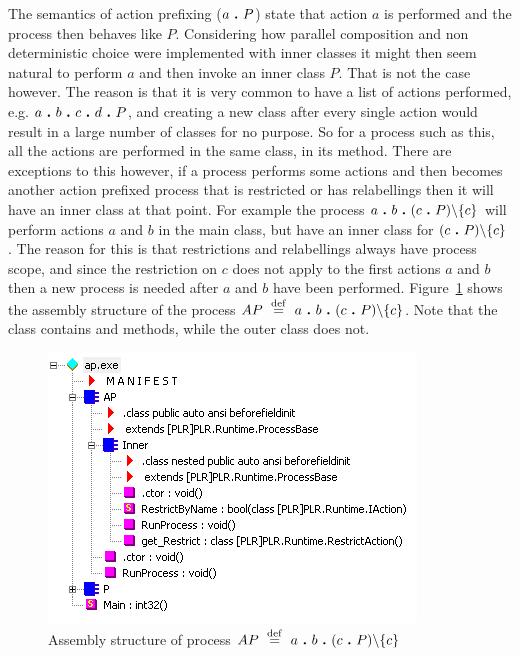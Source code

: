 	The semantics of action prefixing ($a \ \textbf{.}\  P$) state that action $a$ is 
	performed and the process then behaves like $P$. Considering how parallel 
	composition and non deterministic choice were implemented with inner classes 
	it might then seem natural to perform $a$ and then invoke an inner class 
	$P$. That is not the case however. The reason is that it is very common to 
	have a list of actions performed, e.g. $a \ \textbf{.}\  b \ \textbf{.}\  c \ \textbf{.}\  d 
	\ \textbf{.}\  P$, and creating a new class after every single action would result 
	in a large number of classes for no purpose. So for a process such as this, 
	all the actions are performed in the same class, in its  
	method. There are exceptions to this however, if a process performs some 
	actions and then becomes another action prefixed process that is restricted 
	or has relabellings then it will have an inner class at that point. For 
	example the process $a \ \textbf{.}\  b \ \textbf{.}\  (c \ \textbf{.}\  P) \backslash\{c\}$ will 
	perform actions $a$ and $b$ in the main class, but have an inner class for 
	$(c \ \textbf{.}\  P) \backslash\{c\}$. The reason for this is that restrictions 
	and relabellings always have process scope, and since the restriction on $c$ 
	does not apply to the first actions $a$ and $b$ then a new process is needed 
	after $a$ and $b$ have been performed. Figure~\ref{fig:struct_actionprefix} 
	shows the assembly structure of the process $AP \ \stackrel{\mathrm{def}}{=}\  a \ \textbf{.}\  b \ \textbf{.}\  
	(c \ \textbf{.}\  P) \backslash\{c\}$. Note that the class  
	contains  and  methods, while the 
	outer class  does not.

	\begin{figure}
		\begin{center}\includegraphics[scale=0.75]{ex_ap.png}\end{center}
		\caption{Assembly structure of process  $AP \ \stackrel{\mathrm{def}}{=}\  a \ \textbf{.}\  b \ \textbf{.}\  (c 
	\ \textbf{.}\  P) \backslash\{c\}$}
		\label{fig:struct_actionprefix}
	\end{figure}
	
